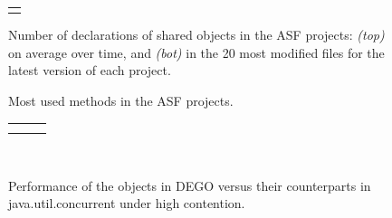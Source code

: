 \documentclass{article}
\begin{document}
    \centering

    \begin{figure}
        \begin{minipage}[b]{0.8\textwidth}
            \begin{tabular}{l}
                \begin{tikzpicture}
                    
                \end{tikzpicture}

                \\
                
            \end{tabular}
        \end{minipage}
        \caption{
            Number of declarations of shared objects in the ASF projects:
            \emph{(top)} on average over time, and
            \emph{(bot)} in the 20 most modified files for the latest version of each project.
        }
    \end{figure}

    \begin{figure}
        
        \caption{
            Most used methods in the ASF projects.
        }
    \end{figure}

    \begin{figure}
        \hspace{-10.8em}%
        \begin{tabular}[t]{c c c}
            \begin{tikzpicture}[baseline={(current axis.north)}]
            
            \end{tikzpicture}
            &
            \begin{tikzpicture}[baseline={(current axis.north)}]
            
            \end{tikzpicture}
            &
            \begin{tikzpicture}[baseline={(current axis.north)}]
            
            \end{tikzpicture}
            \\
            \begin{tikzpicture}[baseline={(current axis.north)}]
            
            \end{tikzpicture}
            &
            \begin{tikzpicture}[baseline={(current axis.north)}]
            
            \end{tikzpicture}
            \\
        \end{tabular}
        ~~~~
        \caption{
            Performance of the objects in DEGO versus their counterparts in java.util.concurrent under high contention.
        }
    \end{figure}
\end{document}
